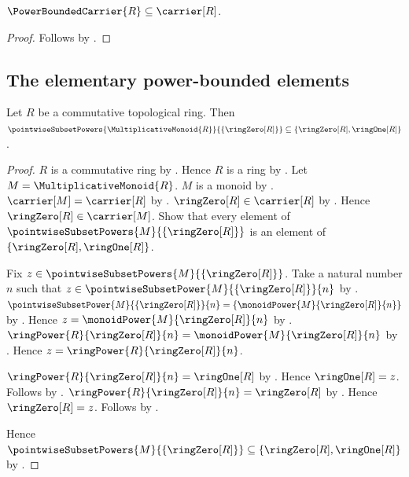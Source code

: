 \begin{proposition}\label{power_bounded_carrier_subseteq}
    $\PowerBoundedCarrier{R}\subseteq\carrier[R]$.
\end{proposition}
\begin{proof}
    Follows by .
\end{proof}

\subsection{The elementary power-bounded elements}

\begin{proposition}\label{topological_ring_zero_power_envelope}
    Let $R$ be a commutative topological ring.
    Then $\pointwiseSubsetPowers{\MultiplicativeMonoid{R}}{
        \{\ringZero[R]\}}\subseteq\{\ringZero[R],\ringOne[R]\}$.
\end{proposition}
\begin{proof}
    $R$ is a commutative ring by
        .
    Hence $R$ is a ring by .
    Let $M=\MultiplicativeMonoid{R}$.
    $M$ is a monoid by .
    $\carrier[M]=\carrier[R]$ by .
    $\ringZero[R]\in\carrier[R]$ by .
    Hence $\ringZero[R]\in\carrier[M]$.
    Show that every element of
        $\pointwiseSubsetPowers{M}{\{\ringZero[R]\}}$ is an element of
        $\{\ringZero[R],\ringOne[R]\}$.
    \begin{subproof}
        Fix $z\in\pointwiseSubsetPowers{M}{\{\ringZero[R]\}}$.
        Take a natural number $n$ such that
            $z\in\pointwiseSubsetPower{M}{\{\ringZero[R]\}}{n}$ by
            .
        $\pointwiseSubsetPower{M}{\{\ringZero[R]\}}{n}
            =\{\monoidPower{M}{\ringZero[R]}{n}\}$ by
            .
        Hence $z=\monoidPower{M}{\ringZero[R]}{n}$ by
            .
        $\ringPower{R}{\ringZero[R]}{n}
            =\monoidPower{M}{\ringZero[R]}{n}$ by .
        Hence $z=\ringPower{R}{\ringZero[R]}{n}$.
        \begin{byCase}
            $\ringPower{R}{\ringZero[R]}{n}=\ringOne[R]$ by
                .
            Hence $\ringOne[R]=z$.
            Follows by .
            $\ringPower{R}{\ringZero[R]}{n}=\ringZero[R]$ by
                .
            Hence $\ringZero[R]=z$.
            Follows by .
        \end{byCase}
    \end{subproof}
    Hence $\pointwiseSubsetPowers{M}{\{\ringZero[R]\}}
        \subseteq\{\ringZero[R],\ringOne[R]\}$ by .
\end{proof}

